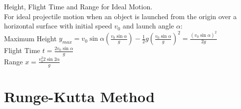\documentclass{report}
\begin{document}
		\begin{framed}
			Height, Flight Time and Range for Ideal Motion. \\
			For ideal projectile motion when an object is launched from the origin over a horizontal surface with initial speed $v_{0}$ and launch angle $\alpha$: \\
			\hspace*{2 em}Maximum Height $y_{max} = v_{0}\sin\alpha(\frac{v_{0}\sin\alpha}{g}) -\frac{1}{2}g(\frac{v_{0}\sin\alpha}{g})^2 = \frac{(v_{0}\sin\alpha)^2}{2g}$\\
			\hspace*{10 em} Flight Time $t = \frac{2v_{0}\sin\alpha}{g}$\\
			\hspace*{10 em} Range $x =  \frac{v^2_{0}2\sin2\alpha}{g}$\\
		\end{framed}
	\chapter{Runge-Kutta Method} 
\end{document}
